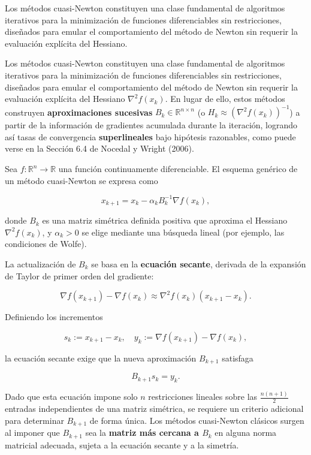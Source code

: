 \documentclass[
  spanish,
  us-letterpaper,
]{scrreprt}
\numberwithin{equation}{section}
\begin{document}
Los métodos cuasi-Newton constituyen una clase fundamental de algoritmos
iterativos para la minimización de funciones diferenciables sin
restricciones, diseñados para emular el comportamiento del método de
Newton sin requerir la evaluación explícita del Hessiano.

Los métodos cuasi-Newton constituyen una clase fundamental de algoritmos
iterativos para la minimización de funciones diferenciables sin
restricciones, diseñados para emular el comportamiento del método de
Newton sin requerir la evaluación explícita del Hessiano
\(\nabla^2 f(x_k)\). En lugar de ello, estos métodos construyen
\textbf{aproximaciones sucesivas} \(B_k \in \mathbb{R}^{n \times n}\) (o
\(H_k \approx (\nabla^2 f(x_k))^{-1}\)) a partir de la información de
gradientes acumulada durante la iteración, logrando así tasas de
convergencia \textbf{superlineales} bajo hipótesis razonables, como
puede verse en la Sección 6.4 de Nocedal y Wright (2006).

Sea \(f : \mathbb{R}^n \to \mathbb{R}\) una función continuamente
diferenciable. El esquema genérico de un método cuasi-Newton se expresa
como

\[
x_{k+1} = x_k - \alpha_k B_k^{-1} \nabla f(x_k),
\]

donde \(B_k\) es una matriz simétrica definida positiva que aproxima el
Hessiano \(\nabla^2 f(x_k)\), y \(\alpha_k > 0\) se elige mediante una
búsqueda lineal (por ejemplo, las condiciones de Wolfe).

La actualización de \(B_k\) se basa en la \textbf{ecuación secante},
derivada de la expansión de Taylor de primer orden del gradiente:

\[
\nabla f(x_{k+1}) - \nabla f(x_k) \approx \nabla^2 f(x_k)(x_{k+1} - x_k).
\]

Definiendo los incrementos

\[
s_k := x_{k+1} - x_k, \quad y_k := \nabla f(x_{k+1}) - \nabla f(x_k),
\]

la ecuación secante exige que la nueva aproximación \(B_{k+1}\)
satisfaga

\[
B_{k+1} s_k = y_k.
\]

Dado que esta ecuación impone solo \(n\) restricciones lineales sobre
las \(\tfrac{n(n+1)}{2}\) entradas independientes de una matriz
simétrica, se requiere un criterio adicional para determinar \(B_{k+1}\)
de forma única. Los métodos cuasi-Newton clásicos surgen al imponer que
\(B_{k+1}\) sea la \textbf{matriz más cercana a \(B_k\)} en alguna norma
matricial adecuada, sujeta a la ecuación secante y a la simetría.
\end{document}
